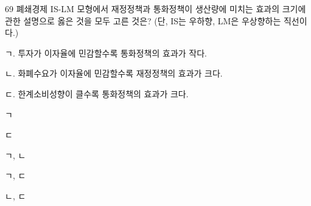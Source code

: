 \begin{question}{69}
폐쇄경제 IS-LM 모형에서 재정정책과 통화정책이 생산량에 미치는 효과의 크기에 관한 설명으로 옳은 것을 모두 고른 것은? (단, IS는 우하향, LM은 우상향하는 직선이다.)
\begin{framedtext}
ㄱ. 투자가 이자율에 민감할수록 통화정책의 효과가 작다. \par
ㄴ. 화폐수요가 이자율에 민감할수록 재정정책의 효과가 크다. \par
ㄷ. 한계소비성향이 클수록 통화정책의 효과가 크다.
\end{framedtext}
\begin{choices}
  \item ㄱ
  \item ㄷ
  \item ㄱ, ㄴ
  \item ㄱ, ㄷ
  \item ㄴ, ㄷ
\end{choices}
\end{question}
